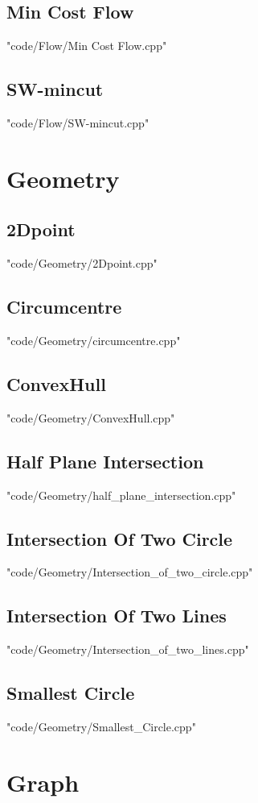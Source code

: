 \subsection{Min Cost Flow}
 {"code/Flow/Min Cost Flow.cpp"}
\subsection{SW-mincut}
 {"code/Flow/SW-mincut.cpp"}
\section{Geometry}
\subsection{2Dpoint}
 {"code/Geometry/2Dpoint.cpp"}
\subsection{Circumcentre}
 {"code/Geometry/circumcentre.cpp"}
\subsection{ConvexHull}
 {"code/Geometry/ConvexHull.cpp"}
\subsection{Half Plane Intersection}
 {"code/Geometry/half_plane_intersection.cpp"}
\subsection{Intersection Of Two Circle}
 {"code/Geometry/Intersection_of_two_circle.cpp"}
\subsection{Intersection Of Two Lines}
 {"code/Geometry/Intersection_of_two_lines.cpp"}
\subsection{Smallest Circle}
 {"code/Geometry/Smallest_Circle.cpp"}
\section{Graph}
